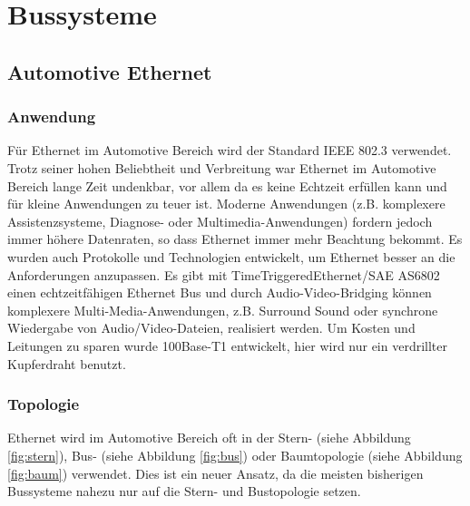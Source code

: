 \graphicspath{{./Images/Kapitel4/}}

\section{Bussysteme}

\subsection{Automotive Ethernet}
\subsubsection{Anwendung}
Für Ethernet im Automotive Bereich wird der Standard IEEE 802.3 verwendet. Trotz seiner hohen Beliebtheit und Verbreitung war Ethernet im Automotive Bereich lange Zeit undenkbar, vor allem da es keine Echtzeit erfüllen kann und für kleine Anwendungen zu teuer ist. Moderne Anwendungen (z.B. komplexere Assistenzsysteme, Diagnose- oder Multimedia-Anwendungen) fordern jedoch immer höhere Datenraten, so dass Ethernet immer mehr Beachtung bekommt. Es wurden auch Protokolle und Technologien entwickelt, um Ethernet besser an die Anforderungen anzupassen. Es gibt mit TimeTriggeredEthernet/SAE AS6802 einen echtzeitfähigen Ethernet Bus und durch Audio-Video-Bridging können komplexere Multi-Media-Anwendungen, z.B. Surround Sound oder synchrone Wiedergabe von Audio/Video-Dateien, realisiert werden. Um Kosten und Leitungen zu sparen wurde 100Base-T1 entwickelt, hier wird nur ein verdrillter Kupferdraht benutzt. \cite{.MH_Ethernet}

\subsubsection{Topologie}
Ethernet wird im Automotive Bereich oft in der Stern- (siehe Abbildung \ref{fig:stern}), Bus- (siehe Abbildung \ref{fig:bus}) oder Baumtopologie (siehe Abbildung \ref{fig:baum}) verwendet. Dies ist ein neuer Ansatz, da die meisten bisherigen Bussysteme nahezu nur auf die Stern- und Bustopologie setzen.

\cite{.MH_Vehicle}

